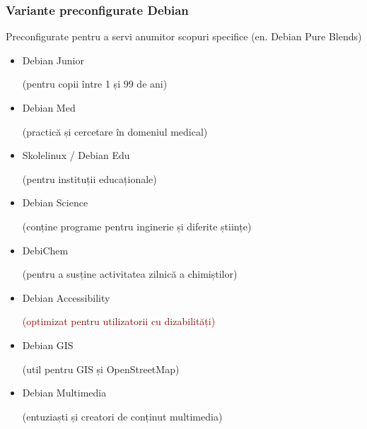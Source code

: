 \documentclass[xcolor=dvipsnames]{beamer}
\begin{document}
\begin{frame}
\frametitle{Variante preconfigurate Debian}
\begin{block}
{Preconfigurate pentru a servi anumitor scopuri specifice}
(en. Debian Pure Blends)\\
\begin{itemize}
\item Debian Junior
	\begin{footnotesize}
		(pentru copii între 1 și 99 de ani)
	\end{footnotesize} 
\item Debian Med
	\begin{footnotesize}
		(practică și cercetare în domeniul medical)
	\end{footnotesize} 
\item Skolelinux / Debian Edu
	\begin{footnotesize}
		(pentru instituții educaționale)
	\end{footnotesize} 
\item Debian Science
	\begin{footnotesize}
		(conține programe pentru inginerie și diferite științe)
	\end{footnotesize} 
\item DebiChem
	\begin{footnotesize}
		(pentru a susține activitatea zilnică a chimiștilor)
	\end{footnotesize} 
\item Debian Accessibility
	\begin{footnotesize}
		\textcolor{darkred}{(optimizat pentru utilizatorii cu dizabilități)}
	\end{footnotesize} 
\item \textcolor{fade}{Debian GIS}
	\begin{footnotesize}
		\textcolor{fade}{(util pentru GIS și OpenStreetMap)}
	\end{footnotesize} 
\item \textcolor{fade}{Debian Multimedia}
	\begin{footnotesize}
		\textcolor{fade}{(entuziaști și creatori de conținut multimedia)}
	\end{footnotesize} 
\end{itemize}
\end{block}
\end{frame}
\end{document}
